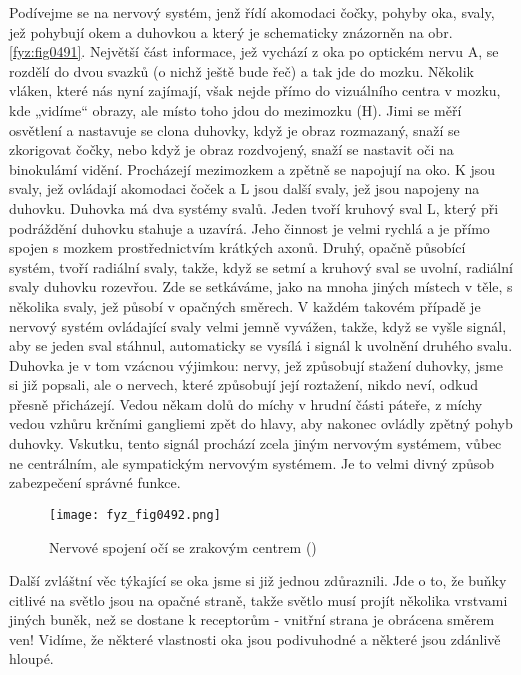     Podívejme se na nervový systém, jenž řídí akomodaci čočky, pohyby oka, svaly, jež pohybují okem
    a duhovkou a který je schematicky znázorněn na obr. \ref{fyz:fig0491}. Největší část informace,
    jež vychází z oka po optickém nervu A, se rozdělí do dvou svazků (o nichž ještě bude řeč) a tak
    jde do mozku. Několik vláken, které nás nyní zajímají, však nejde přímo do vizuálního centra v
    mozku, kde „vidíme“ obrazy, ale místo toho jdou do mezimozku (H). Jimi se měří osvětlení a
    nastavuje se clona duhovky, když je obraz rozmazaný, snaží se zkorigovat čočky, nebo když je
    obraz rozdvojený, snaží se nastavit oči na binokulámí vidění. Procházejí mezimozkem a zpětně se
    napojují na oko. K jsou svaly, jež ovládají akomodaci čoček a L jsou další svaly, jež jsou
    napojeny na duhovku. Duhovka má dva systémy svalů. Jeden tvoří kruhový sval L, který při
    podráždění duhovku stahuje a uzavírá. Jeho činnost je velmi rychlá a je přímo spojen s mozkem
    prostřednictvím krátkých axonů. Druhý, opačně působící systém, tvoří radiální svaly, takže, když
    se setmí a kruhový sval se uvolní, radiální svaly duhovku rozevřou. Zde se setkáváme, jako na
    mnoha jiných místech v těle, s několika svaly, jež působí v opačných směrech. V každém takovém
    případě je nervový systém ovládající svaly velmi jemně vyvážen, takže, když se vyšle signál, aby
    se jeden sval stáhnul, automaticky se vysílá i signál k uvolnění druhého svalu. Duhovka je v tom
    vzácnou výjimkou: nervy, jež způsobují stažení duhovky, jsme si již popsali, ale o nervech,
    které způsobují její roztažení, nikdo neví, odkud přesně přicházejí. Vedou někam dolů do míchy v
    hrudní části páteře, z míchy vedou vzhůru krčními gangliemi zpět do hlavy, aby nakonec ovládly
    zpětný pohyb duhovky. Vskutku, tento signál prochází zcela jiným nervovým systémem, vůbec ne
    centrálním, ale sympatickým nervovým systémem. Je to velmi divný způsob zabezpečení správné
    funkce.
    
    \begin{figure}[ht!] %
      \centering
      \texttt{[image: fyz\_fig0492.png]}
      \caption{Nervové spojení očí se zrakovým centrem (\cite[s.~697]{Feynman01})}
      \label{fyz:fig0492}
    \end{figure}

    Další zvláštní věc týkající se oka jsme si již jednou zdůraznili. Jde o to, že buňky citlivé na
    světlo jsou na opačné straně, takže světlo musí projít několika vrstvami jiných buněk, než se
    dostane k receptorům - vnitřní strana je obrácena směrem ven! Vidíme, že některé vlastnosti oka
    jsou podivuhodné a některé jsou zdánlivě hloupé.

